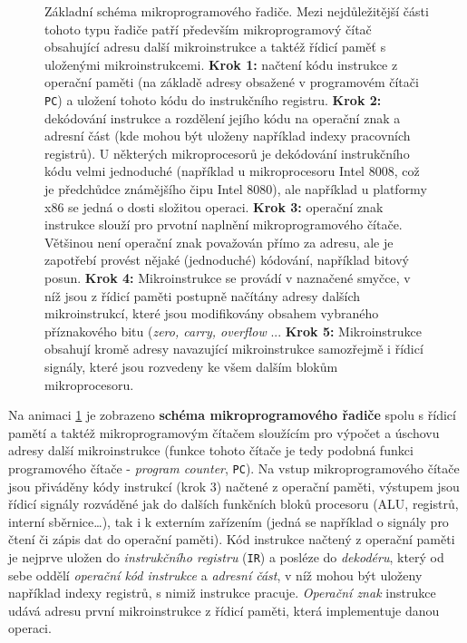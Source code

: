       \begin{figure}[ht!]
        \caption{Základní schéma mikroprogramového řadiče. Mezi nejdůležitější části tohoto typu 
        řadiče patří především mikroprogramový čítač obsahující adresu další mikroinstrukce a taktéž
        řídicí paměť s uloženými mikroinstrukcemi. \textbf{Krok 1:} načtení kódu instrukce z
        operační paměti (na základě adresy obsažené v programovém čítači \texttt{PC}) a uložení
        tohoto kódu do instrukčního registru. \textbf{Krok 2:} dekódování instrukce a rozdělení
        jejího kódu na operační znak a adresní část (kde mohou být uloženy například indexy
        pracovních registrů). U některých mikroprocesorů je dekódování instrukčního kódu velmi
        jednoduché (například u mikroprocesoru Intel 8008, což je předchůdce známějšího čipu Intel
        8080), ale například u platformy x86 se jedná o dosti složitou operaci. \textbf{Krok 3:}
        operační znak instrukce slouží pro prvotní naplnění mikroprogramového čítače. Většinou není
        operační znak považován přímo za adresu, ale je zapotřebí provést nějaké (jednoduché)
        kódování, například bitový posun. \textbf{Krok 4:} Mikroinstrukce se provádí v naznačené
        smyčce, v níž jsou z řídicí paměti postupně načítány adresy dalších mikroinstrukcí, které
        jsou modifikovány obsahem vybraného příznakového bitu (\emph{zero, carry, overflow} ...
        \textbf{Krok 5:} Mikroinstrukce obsahují kromě adresy navazující mikroinstrukce samozřejmě i
        řídicí signály, které jsou rozvedeny ke všem dalším blokům mikroprocesoru.}
        \label{ces:fig020}
      \end{figure}  
       
      Na animaci \ref{ces:fig020} je zobrazeno \textbf{schéma mikroprogramového řadiče} spolu 
      s řídicí pamětí a taktéž mikroprogramovým čítačem sloužícím pro výpočet a úschovu adresy 
      další mikroinstrukce (funkce tohoto čítače je tedy podobná funkci programového čítače - 
      \emph{program counter}, \texttt{PC}). Na vstup mikroprogramového čítače jsou přiváděny kódy 
      instrukcí (krok 3) načtené z operační paměti, výstupem jsou řídicí signály rozváděné jak do 
      dalších funkčních bloků procesoru (ALU, registrů, interní sběrnice…), tak i k externím 
      zařízením (jedná se například o signály pro čtení či zápis dat do operační paměti). Kód 
      instrukce načtený z operační paměti je nejprve uložen do \emph{instrukčního registru} 
      (\texttt{IR}) a posléze do \emph{dekodéru}, který od sebe oddělí \emph{operační kód 
      instrukce} a \emph{adresní část}, v níž mohou být uloženy například indexy registrů, s nimiž 
      instrukce pracuje. \emph{Operační znak} instrukce udává adresu první mikroinstrukce z řídicí 
      paměti, která implementuje danou operaci.
      
